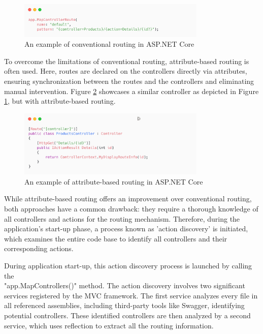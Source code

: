 \begin{figure}[H]
\centering
\includegraphics[width=0.8\textwidth]{graphics/conventional-routing.png}
\caption{An example of conventional routing in ASP.NET Core}
\label{fig:conventional-routing}
\end{figure}

To overcome the limitations of conventional routing, attribute-based routing is often used. Here, routes are declared on the controllers directly via attributes, ensuring synchronization between the routes and the controllers and eliminating manual intervention. Figure \ref{fig:attribute-routing} showcases a similar controller as depicted in Figure \ref{fig:conventional-routing}, but with attribute-based routing.

\begin{figure}[H]
\centering
\includegraphics[width=0.8\textwidth]{graphics/attribute-routing.png}
\caption{An example of attribute-based routing in ASP.NET Core}
\label{fig:attribute-routing}
\end{figure}

While attribute-based routing offers an improvement over conventional routing, both approaches have a common drawback: they require a thorough knowledge of all controllers and actions for the routing mechanism. Therefore, during the application's start-up phase, a process known as 'action discovery' is initiated, which examines the entire code base to identify all controllers and their corresponding actions.

During application start-up, this action discovery process is launched by calling the \\"app.MapControllers()" method. The action discovery involves two significant services registered by the MVC framework. The first service analyzes every file in all referenced assemblies, including third-party tools like Swagger, identifying potential controllers. These identified controllers are then analyzed by a second service, which uses reflection to extract all the routing information.

